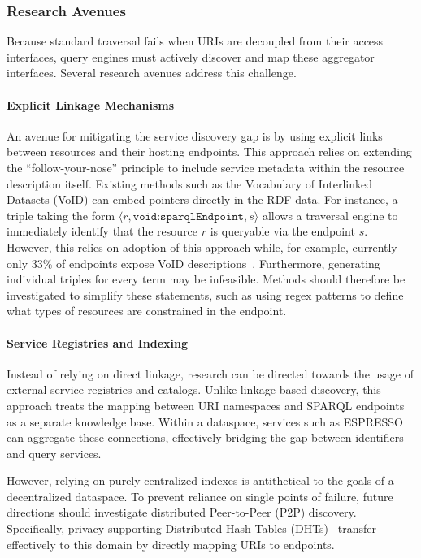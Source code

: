 \documentclass{ceurart}
\theoremstyle{definition}
\begin{document}
\subsubsection{Research Avenues}
Because standard traversal fails when URIs are decoupled from their access interfaces,
query engines must actively discover and map these aggregator interfaces.
Several research avenues address this challenge.

\paragraph{Explicit Linkage Mechanisms}
An avenue for mitigating the service discovery gap is by using explicit links between resources and their hosting endpoints. 
This approach relies on extending the ``follow-your-nose'' principle to include service metadata within the resource description itself. 
Existing methods such as the Vocabulary of Interlinked Datasets (VoID) can embed pointers directly in the RDF data. 
For instance, a triple taking the form $\langle r, \texttt{void:sparqlEndpoint}, s \rangle$ allows a traversal engine to immediately identify
that the resource $r$ is queryable via the endpoint $s$. 
However, this relies on adoption of this approach while, for example, currently only 33\% of endpoints
expose VoID descriptions~\cite{buil2013sparql}.
Furthermore, generating individual triples for every term may be infeasible.
Methods should therefore be investigated to simplify these statements, such as using regex patterns to define what types of resources are constrained
in the endpoint.

\paragraph{Service Registries and Indexing}
Instead of relying on direct linkage, research can be directed towards the usage of external service registries and catalogs. 
Unlike linkage-based discovery, this approach treats the mapping between URI namespaces and SPARQL endpoints as a separate knowledge base. 
Within a dataspace, services such as ESPRESSO~\cite{ragab2023espresso} can aggregate these connections,
effectively bridging the gap between identifiers and query services.

However, relying on purely centralized indexes is antithetical to the goals of a decentralized dataspace. 
To prevent reliance on single points of failure, 
future directions should investigate distributed Peer-to-Peer (P2P) discovery.
Specifically, privacy-supporting Distributed Hash Tables (DHTs)~\cite{roncancio2009data} 
transfer effectively to this domain by directly mapping URIs to endpoints. 
\end{document}
